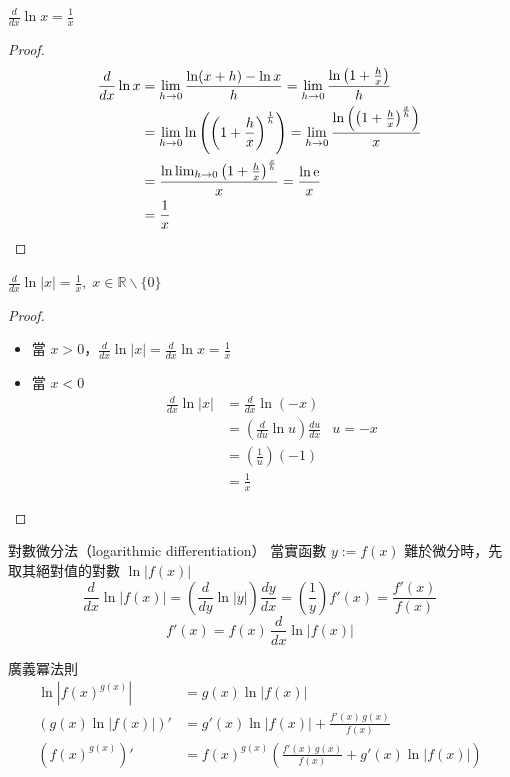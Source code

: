 \documentclass{beamer}
\begin{document}
\begin{CJK}{UTF8}{bsmi}
\begin{frame}{$\displaystyle \frac{d}{dx} \ln x = \frac{1}{x}$}
  \begin{proof}
    \begin{align*}
      \frac{d}{dx} \ln x &= \lim_{h\to0} \frac{\ln(x+h) - \ln x}{h}
			  = \lim_{h\to0} \frac{\ln \left( 1 + \frac{h}{x} \right)}{h}\\
	&= \lim_{h\to0} \ln \left( \left( 1 + \frac{h}{x} \right)^\frac{1}{h} \right)
	 = \lim_{h\to0} \frac{\ln \left( \left( 1 + \frac{h}{x} \right)^\frac{x}{h} \right)}{x}\\
	&= \frac{\ln \lim_{h\to0} \left( 1 + \frac{h}{x} \right)^\frac{x}{h}}{x} = \frac{\ln \textup e}{x}\\
	&= \frac{1}{x}
    \end{align*}
  \end{proof}
\end{frame}

\begin{frame}{$\displaystyle \frac{d}{dx} \ln |x| = \frac{1}{x},\; x \in \mathbb R \backslash \{0\}$}
  \begin{proof}
    \begin{itemize}
      \item 當 $x > 0$，$\displaystyle \frac{d}{dx} \ln |x| = \frac{d}{dx} \ln x = \frac{1}{x}$
      \item 當 $x < 0$
	\begin{align*}
	  \frac{d}{dx} \ln |x| &= \frac{d}{dx} \ln(-x)\\
	    &= \left( \frac{d}{du} \ln u \right) \frac{du}{dx} &u = -x\\
	    &= \left( \frac{1}{u} \right) (-1)\\
	    &= \frac{1}{x}
	\end{align*}
    \end{itemize}
  \end{proof}
\end{frame}

\begin{frame}{對數微分法（logarithmic differentiation）}
  當實函數 $y := f(x)$ 難於微分時，先取其絕對值的對數 $\ln |f(x)|$
  \[\frac{d}{dx} \ln |f(x)| = \left( \frac{d}{dy} \ln |y| \right) \frac{dy}{dx} = \left( \frac1y \right) f'(x)
    = \frac{f'(x)}{f(x)}\]
  \[f'(x) = f(x)\, \frac{d}{dx} \ln |f(x)|\]
\end{frame}

\begin{frame}{廣義冪法則}
  \begin{align*}
    \ln \left| f(x)^{g(x)} \right|  &= g(x) \ln |f(x)|\\
    \left( g(x) \ln |f(x)| \right)' &= g'(x) \ln |f(x)| + \frac{f'(x)\,g(x)}{f(x)}\\
    \left( f(x)^{g(x)} \right)'     &= f(x)^{g(x)} \left( \frac{f'(x)\,g(x)}{f(x)} + g'(x) \ln |f(x)| \right)
  \end{align*}
\end{frame}


\end{CJK}
\end{document}
